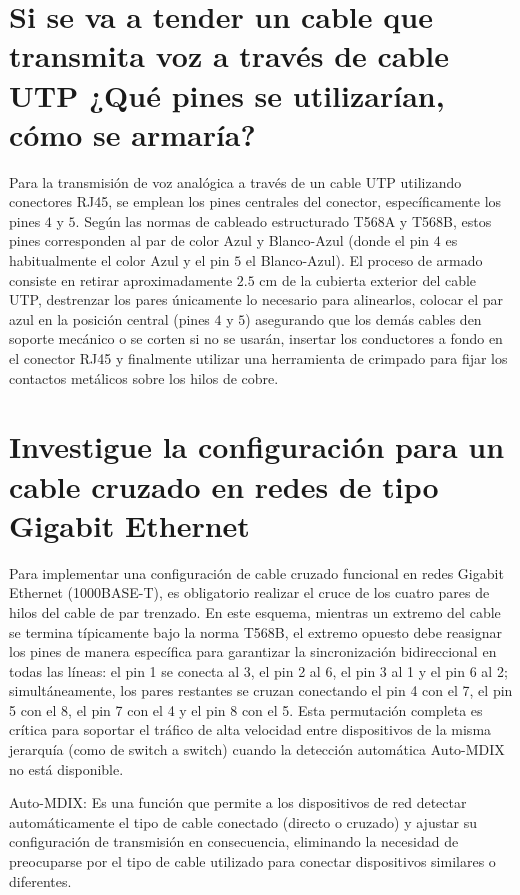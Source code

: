 \documentclass[a4paper,12pt]{article}
\begin{document}
\section{Si se va a tender un cable que transmita voz a través de cable UTP ¿Qué pines se utilizarían, cómo se armaría?}
Para la transmisión de voz analógica a través de un cable UTP utilizando conectores RJ45, se emplean los pines centrales del conector, específicamente los pines $4$ y $5$. Según las normas de cableado estructurado T568A y T568B, estos pines corresponden al par de color Azul y Blanco-Azul (donde el pin $4$ es habitualmente el color Azul y el pin $5$ el Blanco-Azul). El proceso de armado consiste en retirar aproximadamente $2.5$ cm de la cubierta exterior del cable UTP, destrenzar los pares únicamente lo necesario para alinearlos, colocar el par azul en la posición central (pines $4$ y $5$) asegurando que los demás cables den soporte mecánico o se corten si no se usarán, insertar los conductores a fondo en el conector RJ45 y finalmente utilizar una herramienta de crimpado para fijar los contactos metálicos sobre los hilos de cobre.


\newpage
\section{Investigue la configuración para un cable cruzado en redes de tipo Gigabit Ethernet}

Para implementar una configuración de cable cruzado funcional en redes Gigabit Ethernet (1000BASE-T), es obligatorio realizar el cruce de los cuatro pares de hilos del cable de par trenzado. En este esquema, mientras un extremo del cable se termina típicamente bajo la norma T568B, el extremo opuesto debe reasignar los pines de manera específica para garantizar la sincronización bidireccional en todas las líneas: el pin 1 se conecta al 3, el pin 2 al 6, el pin 3 al 1 y el pin 6 al 2; simultáneamente, los pares restantes se cruzan conectando el pin 4 con el 7, el pin 5 con el 8, el pin 7 con el 4 y el pin 8 con el 5. Esta permutación completa es crítica para soportar el tráfico de alta velocidad entre dispositivos de la misma jerarquía (como de switch a switch) cuando la detección automática Auto-MDIX no está disponible.

\vspace{0.5cm}
Auto-MDIX: Es una función que permite a los dispositivos de red detectar automáticamente el tipo de cable conectado (directo o cruzado) y ajustar su configuración de transmisión en consecuencia, eliminando la necesidad de preocuparse por el tipo de cable utilizado para conectar dispositivos similares o diferentes.
\end{document}
